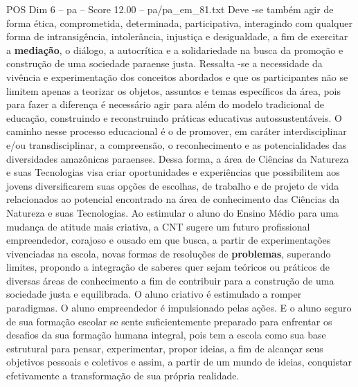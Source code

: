 \begin{textsample}{POS Dim 6 – pa – Score 12.00 – pa/pa\_em\_81.txt}
Deve -se também agir de forma ética, comprometida, determinada, participativa, interagindo com qualquer forma de intransigência, intolerância, injustiça e desigualdade, a fim de exercitar a \textbf{mediação}, o diálogo, a autocrítica e a solidariedade na busca da promoção e construção de uma sociedade paraense justa.
Ressalta -se a necessidade da vivência e experimentação dos conceitos abordados e que os participantes não se limitem apenas a teorizar os objetos, assuntos e temas específicos da área, pois para fazer a diferença é necessário agir para além do modelo tradicional de educação, construindo e reconstruindo práticas educativas autossustentáveis.
O caminho nesse processo educacional é o de promover, em caráter interdisciplinar e/ou transdisciplinar, a compreensão, o reconhecimento e as potencialidades das diversidades amazônicas paraenses.
Dessa forma, a área de Ciências da Natureza e suas Tecnologias visa criar oportunidades e experiências que possibilitem aos jovens diversificarem suas opções de escolhas, de trabalho e de projeto de vida relacionados ao potencial encontrado na área de conhecimento das Ciências da Natureza e suas Tecnologias.
Ao estimular o aluno do Ensino Médio para uma mudança de atitude mais criativa, a CNT sugere um futuro profissional empreendedor, corajoso e ousado em que busca, a partir de experimentações vivenciadas na escola, novas formas de resoluções de \textbf{problemas}, superando limites, propondo a integração de saberes quer sejam teóricos ou práticos de diversas áreas de conhecimento a fim de contribuir para a construção de uma sociedade justa e equilibrada.
O aluno criativo é estimulado a romper paradigmas.
O aluno empreendedor é impulsionado pelas ações.
E o aluno seguro de sua formação escolar se sente suficientemente preparado para enfrentar os desafios da sua formação humana integral, pois tem a escola como sua base estrutural para pensar, experimentar, propor ideias, a fim de alcançar seus objetivos pessoais e coletivos e assim, a partir de um mundo de ideias, conquistar efetivamente a transformação de sua própria realidade.

\end{textsample}
